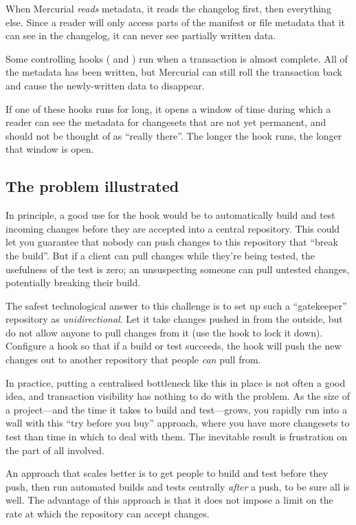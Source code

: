 When Mercurial \emph{reads} metadata, it reads the changelog first,
then everything else.  Since a reader will only access parts of the
manifest or file metadata that it can see in the changelog, it can
never see partially written data.

Some controlling hooks ( and
) run when a transaction is almost complete.
All of the metadata has been written, but Mercurial can still roll the
transaction back and cause the newly-written data to disappear.

If one of these hooks runs for long, it opens a window of time during
which a reader can see the metadata for changesets that are not yet
permanent, and should not be thought of as ``really there''.  The
longer the hook runs, the longer that window is open.

\subsection{The problem illustrated}

In principle, a good use for the  hook would
be to automatically build and test incoming changes before they are
accepted into a central repository.  This could let you guarantee that
nobody can push changes to this repository that ``break the build''.
But if a client can pull changes while they're being tested, the
usefulness of the test is zero; an unsuspecting someone can pull
untested changes, potentially breaking their build.

The safest technological answer to this challenge is to set up such a
``gatekeeper'' repository as \emph{unidirectional}.  Let it take
changes pushed in from the outside, but do not allow anyone to pull
changes from it (use the  hook to lock it down).
Configure a  hook so that if a build or test
succeeds, the hook will push the new changes out to another repository
that people \emph{can} pull from.

In practice, putting a centralised bottleneck like this in place is
not often a good idea, and transaction visibility has nothing to do
with the problem.  As the size of a project---and the time it takes to
build and test---grows, you rapidly run into a wall with this ``try
before you buy'' approach, where you have more changesets to test than
time in which to deal with them.  The inevitable result is frustration
on the part of all involved.

An approach that scales better is to get people to build and test
before they push, then run automated builds and tests centrally
\emph{after} a push, to be sure all is well.  The advantage of this
approach is that it does not impose a limit on the rate at which the
repository can accept changes.

